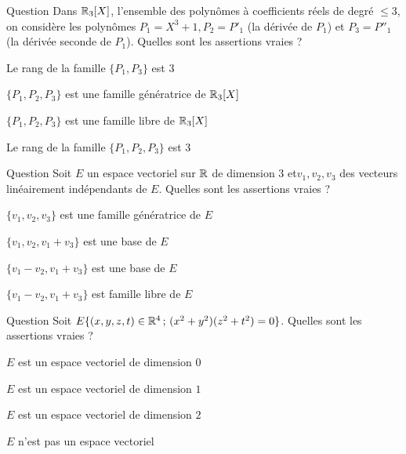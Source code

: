 \begin{multi}[multiple,feedback=
{On vérifie que \(\{P_1,P_2,P_3 \}\) est une famille libre de \(\Rr_3[X]\) (ce sont des polynômes de degrés 
distincts). Par contre, elle n'est pas génératrice de \(\Rr_3[X]\), puisque la dimension de cet espace est \(4\).
\vskip2mm
Le rang d'une famille de vecteurs est la dimension du sous-espace vectoriel engendré par ces vecteurs. Autrement dit, c'est le nombre maximum de vecteurs linéairement indépendants de cette famille.
}]{Question}
Dans \(\Rr_3[X]\), l'ensemble des polynômes à coefficients réels de degré \(\le 3\), on considère les polynômes \(P_1= X^3+1, P_2= P'_1 \) (la dérivée de \(P_1\)) et  \( P_3 = P''_1\) (la dérivée seconde  de \(P_1\)). Quelles sont les assertions vraies ?

    \item Le rang de la famille \(\{P_1, P_3 \}\) est \(3\)
    \item \(\{P_1,P_2,P_3 \}\) est une famille génératrice de \(\Rr_3[X]\)
    \item* \(\{P_1,P_2,P_3 \}\) est une famille libre de \(\Rr_3[X]\)
    \item* Le rang de la famille  \(\{P_1, P_2,P_3 \}\) est \(3\)
\end{multi}


\begin{multi}[multiple,feedback=
{Puisque \(\{v_1,v_2,v_3\}\)  est une famille libre qui contient \(3\) vecteurs et la dimension de \(E\) est \(3\), 
elle est génératrice et donc c'est une base de \(E\).
\vskip2mm
On vérifie aussi que \(\{v_1,v_2,v_1+v_3\}\) est une famille libre, 
et donc pour les mêmes raisons que précédemment, c'est une base de \(E\).
}]{Question}
Soit \(E\) un espace vectoriel sur \(\mathbb{R}\) de dimension \(3\) et\(v_1,v_2,v_3\) des vecteurs linéairement indépendants de \(E\).
Quelles sont les assertions vraies ?

    \item* \(\{v_1,v_2,v_3\}\) est une famille génératrice de \(E\)
    \item* \(\{v_1,v_2,v_1+v_3\}\) est une base de \(E\)
    \item \(\{v_1-v_2,v_1+v_3\}\) est une base de \(E\)
    \item* \(\{v_1-v_2,v_1+v_3\}\) est famille libre de \(E\)
\end{multi}


\begin{multi}[multiple,feedback=
{\(E =\{(0,0,z,t)  \, ; \, z,t \in \Rr\} \cup \{(x,y,0,0)  \, ; \, x,y \in \Rr\}\) n'est pas un espace vectoriel.
}]{Question}
Soit \(E \{(x,y,z,t) \in \mathbb{R}^4 \, ; \, (x^2+y^2)(z^2+t^2)=0\}\). Quelles sont les assertions vraies ?

    \item \(E\) est un espace vectoriel de dimension \(0\)
    \item \(E\) est un espace vectoriel de dimension \(1\)
    \item \(E\) est un espace vectoriel de dimension \(2\)
    \item* \(E\) n'est pas un espace vectoriel
\end{multi}


